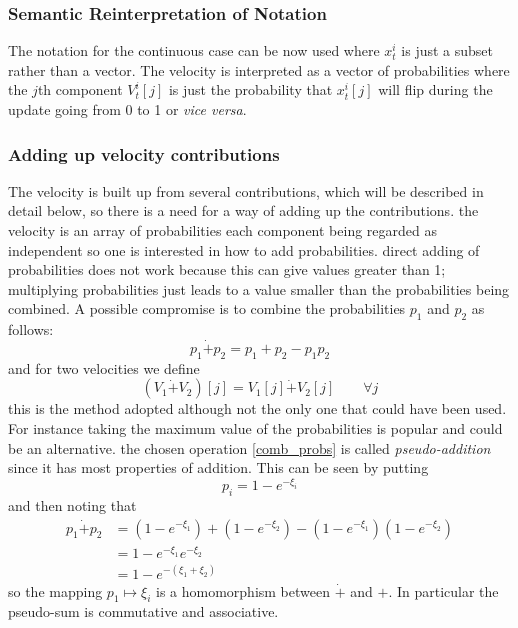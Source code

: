 \documentclass[a4paper,oneside,english]{article}
\numberwithin{equation}{section}
\numberwithin{figure}{section}
\begin{document}
\subsubsection{Semantic Reinterpretation of Notation }
The notation for the continuous case can be now used where $x_t^i$ is just a subset rather than a vector. The velocity is interpreted as a vector of probabilities  where the $j$th component $V_t^i[j]$ is just the probability that $x_t^i[j]$ will flip during the update going from 0 to 1 or \textit{vice versa}.
\subsubsection{Adding up velocity contributions}
The velocity is built up from several contributions, which will be described in detail below, so there is a need for a way of adding up the contributions. the velocity is an array of probabilities each component being regarded as independent so one is interested in how to add probabilities. direct adding of probabilities does not work because this can give values greater than 1; multiplying probabilities just leads to a value smaller  than the probabilities being combined. A possible compromise is to combine the probabilities  $p_1$ and $p_2$ as follows:
\begin{equation}\label{comb_probs}
p_1\dot{+}p_2= p_1+p_2-p_1p_2
\end{equation}
and for two velocities we define
\begin{equation}\label{vel-add}
(V_1\dot{+}V_2)[j]=V_1[j]\dot{+}V_2[j] \qquad \forall j
\end{equation}       
this is the method adopted although not the only one that could have been used. For instance taking the maximum value of the probabilities is popular and could be an alternative. the chosen operation \eqref{comb_probs} is called \emph{pseudo-addition} since it has most properties of addition. This can be seen  by putting 
\begin{equation}\label{add-map}
p_i=1-e^{-\xi_i}
\end{equation}
and then noting that
\begin{align}
p_1\dot{+}p_2&=(1-e^{-\xi_1})+(1-e^{-\xi_2})-(1-e^{-\xi_1})(1-e^{-\xi_2})\\
&=1-e^{-\xi_1}e^{-\xi_2}\\
&=1-e^{-(\xi_1+\xi_2)}
\end{align} 
so the mapping $p_1 \mapsto \xi_i$ is a homomorphism between $\dot{+}$ and  $+$. In particular the pseudo-sum is commutative and associative.
\end{document}
